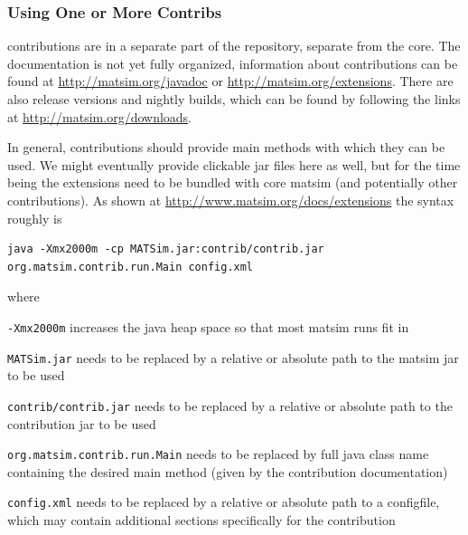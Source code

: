 \subsubsection{Using One or More Contribs}
\label{sec:using-contribs}


\Glspl{contribution} are in a separate part of the repository, separate from the core.  The documentation is not yet fully organized, information about \glspl{contribution} can be found at \url{http://matsim.org/javadoc} or \url{http://matsim.org/extensions}. There are also release versions and nightly builds, which can be found by following the links at %
\url{http://matsim.org/downloads}.

In general, \glspl{contribution} should provide main methods with which they can be used.  We might eventually provide clickable jar files here as well, but for the time being the extensions need to be bundled with core \gls{matsim} (and potentially other \glspl{contribution}). As shown at \url{http://www.matsim.org/docs/extensions} the syntax roughly is
\begin{lstlisting}
java -Xmx2000m -cp MATSim.jar:contrib/contrib.jar org.matsim.contrib.run.Main config.xml  
\end{lstlisting}
where
\begin{compactitem}
\item \lstinline$-Xmx2000m$ increases the \gls{java} heap space so that most \gls{matsim} runs fit in
\item \lstinline$MATSim.jar$ needs to be replaced by a relative or absolute path to the \gls{matsim} jar to be used
\item \lstinline$contrib/contrib.jar$ needs to be replaced by a relative or absolute path to the \gls{contribution} jar to be used
\item \lstinline$org.matsim.contrib.run.Main$ needs to be replaced by full \gls{java} class name containing the desired main method (given by the \gls{contribution} documentation)
\item \lstinline$config.xml$ needs to be replaced by a relative or absolute path to a \gls{configfile}, which may contain additional sections specifically for the \gls{contribution}
\end{compactitem}

